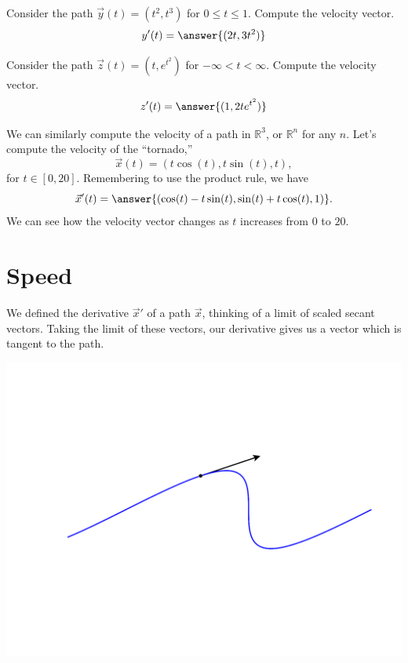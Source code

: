 \documentclass{ximera}
\begin{document}
\begin{problem}
Consider the path $\vec{y}(t) = (t^2,t^3)$ for $0\leq t\leq 1$. Compute the velocity vector.
\[
y'(t) = \answer{(2t, 3t^2)}
\]

Consider the path $\vec{z}(t) = \left(t, e^{t^2}\right)$ for $-\infty < t < \infty$. Compute the velocity vector.
\[
z'(t) = \answer{(1, 2te^{t^2})}
\]
\end{problem}

\begin{example}
We can similarly compute the velocity of a path in $\mathbb{R}^3$, or $\mathbb{R}^n$ for any $n$. Let's compute the velocity of the ``tornado,''
\[
\vec{x}(t) = (t\cos(t),t\sin(t),t),
\]
for $t\in [0,20]$. Remembering to use the product rule, we have
\[
\vec{x}'(t) = \answer{(\cos(t)-t\sin(t),\sin(t)+t\cos(t), 1)}.
\]
We can see how the velocity vector changes as $t$ increases from $0$ to $20$.

\end{example}

\section*{Speed}

We defined the derivative $\vec{x}'$ of a path $\vec{x}$, thinking of a limit of scaled secant vectors. Taking the limit of these vectors, our derivative gives us a vector which is tangent to the path.

\begin{image}
\includegraphics[width=\textwidth]{CalcPlot3D-vel_vector}
\end{image}
\end{document}
